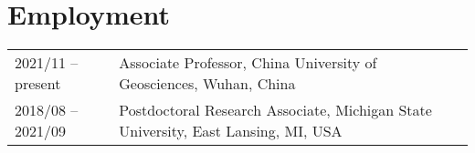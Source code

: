 \section*{Employment}
\begin{tabular}{p{} p{}}
2021/11 -- present & Associate Professor,
					 China University of Geosciences, Wuhan, China \\
2018/08 -- 2021/09 & Postdoctoral Research Associate,
	                 Michigan State University, East Lansing, MI, USA \\
\end{tabular}
